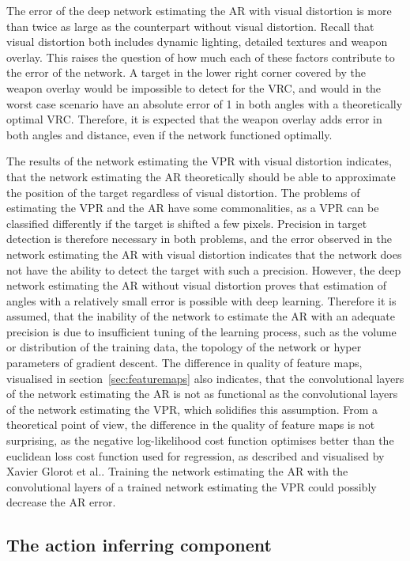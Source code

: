 The error of the deep network estimating the AR with visual distortion is more than twice as large as the counterpart without visual distortion. Recall that visual distortion both includes dynamic lighting, detailed textures and weapon overlay. This raises the question of how much each of these factors contribute to the error of the network. A target in the lower right corner covered by the weapon overlay would be impossible to detect for the VRC, and would in the worst case scenario have an absolute error of 1 in both angles with a theoretically optimal VRC. Therefore, it is expected that the weapon overlay adds error in both angles and distance, even if the network functioned optimally.

The results of the network estimating the VPR with visual distortion indicates, that the network estimating the AR theoretically should be able to approximate the position of the target regardless of visual distortion. The problems of estimating the VPR and the AR have some commonalities, as a VPR can be classified differently if the target is shifted a few pixels. Precision in target detection is therefore necessary in both problems, and the error observed in the network estimating the AR with visual distortion indicates that the network does not have the ability to detect the target with such a precision. However, the deep network estimating the AR without visual distortion proves that estimation of angles with a relatively small error is possible with deep learning. Therefore it is assumed, that the inability of the network  to estimate the AR with an adequate precision is due to insufficient tuning of the learning process, such as the volume or distribution of the training data, the topology of the network or hyper parameters of gradient descent. The difference in quality of feature maps, visualised in section~\ref{sec:featuremaps} also indicates, that the convolutional layers of the network estimating the AR is not as functional as the convolutional layers of the network estimating the VPR, which solidifies this assumption. From a theoretical point of view, the difference in the quality of feature maps is not surprising, as the negative log-likelihood cost function optimises better than the euclidean loss cost function used for regression, as described and visualised by Xavier Glorot et al.\cite{DBLP:journals/jmlr/GlorotB10}. Training the network estimating the AR with the convolutional layers of a trained network estimating the VPR could possibly decrease the AR error.

\subsection{The action inferring component}



